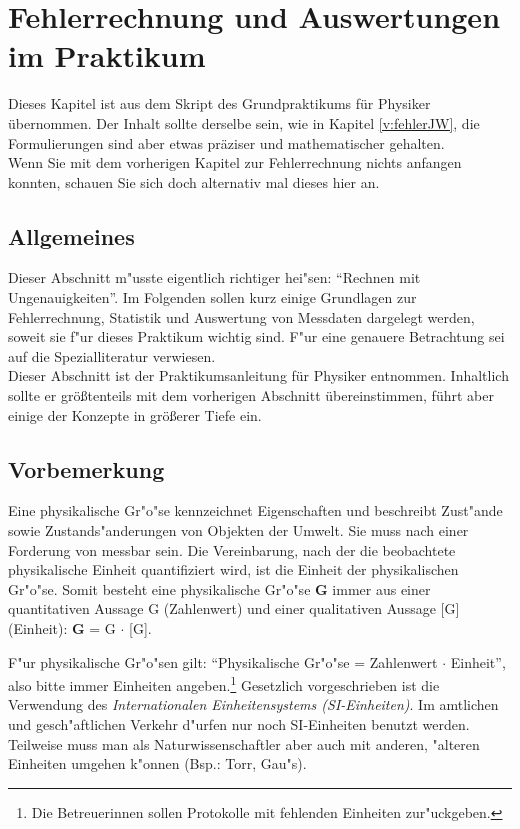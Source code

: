 \chapter{Fehlerrechnung und Auswertungen im Praktikum} \label{v:fehler}

Dieses Kapitel ist aus dem Skript des Grundpraktikums für Physiker übernommen. Der Inhalt sollte derselbe sein, wie in Kapitel \ref{v:fehlerJW}, die Formulierungen sind aber etwas präziser und mathematischer gehalten.\\
Wenn Sie mit dem vorherigen Kapitel zur Fehlerrechnung nichts anfangen konnten, schauen Sie sich doch alternativ mal dieses hier an.

\section{Allgemeines}

Dieser Abschnitt m"usste eigentlich richtiger hei"sen: "`Rechnen mit
Ungenauigkeiten"'. Im Folgenden sollen kurz
einige Grundlagen zur Fehlerrechnung,
Statistik und Auswertung von
Messdaten dargelegt werden, soweit sie f"ur
dieses Praktikum wichtig sind. F"ur eine genauere Betrachtung sei
auf die Spezialliteratur
verwiesen.\\

\noindent
Dieser Abschnitt ist der Praktikumsanleitung für Physiker entnommen. Inhaltlich sollte er größtenteils mit dem vorherigen Abschnitt übereinstimmen, führt aber einige der Konzepte in größerer Tiefe ein.

\section{Vorbemerkung}

Eine physikalische Gr"o"se kennzeichnet
Eigenschaften und beschreibt Zust"ande sowie Zustands"anderungen von
Objekten der Umwelt. Sie muss nach einer Forderung von
 messbar sein. Die Vereinbarung, nach der die
beobachtete physikalische Einheit quantifiziert wird, ist die
Einheit der physikalischen Gr"o"se. Somit besteht eine physikalische
Gr"o"se {\bf G} immer aus einer quantitativen Aussage G (Zahlenwert)
und einer qualitativen Aussage [G] (Einheit): {\bf G} = G $\cdot$
[G].

F"ur physikalische Gr"o"sen gilt: "`Physikalische Gr"o"se = Zahlenwert
$\cdot$ Einheit"', also bitte immer Einheiten angeben.\footnote{Die
Betreuerinnen sollen Protokolle mit fehlenden Einheiten
zur"uckgeben.} Gesetzlich vorgeschrieben ist die Verwendung des
\emph{Internationalen Einheitensystems
(SI-Einheiten)}. Im amtlichen und gesch"aftlichen
Verkehr d"urfen nur noch SI-Einheiten benutzt werden. Teilweise muss man als Naturwissenschaftler aber
auch mit anderen, "alteren Einheiten umgehen k"onnen (Bsp.: Torr,
Gau"s). %

